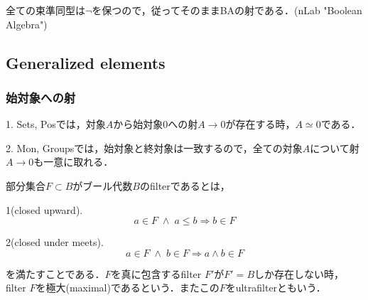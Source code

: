 \documentclass[uplatex, dvipdfmx]{jsarticle}
\begin{document}
\begin{proposition*}
    全ての束準同型は$\lnot$を保つので，従ってそのままBAの射である．(nLab "Boolean Algebra")
\end{proposition*}

\subsection{Generalized elements}\label{subsection-generalized-elements}

\subsubsection*{始対象への射}

\begin{example*}
    1. Sets, Posでは，対象$A$から始対象$0$への射$A\to 0$が存在する時，$A\simeq 0$である．

    2. Mon, Groupsでは，始対象と終対象は一致するので，全ての対象$A$について射$A\to 0$も一意に取れる．
\end{example*}

\begin{definition*}[ultrafilter]
    部分集合$F\subset B$がブール代数$B$のfilterであるとは，

    1(closed upward). \begin{equation}\label{formula-BAfilter-closed-upward}
        a\in F\;\land\; a\le b\Rightarrow b\in F
    \end{equation}

    2(closed under meets). \begin{equation}\label{formula-BAfilter-closed-under-meets}
        a\in F\;\land\; b\in F\Rightarrow a\land b\in F
    \end{equation}
    
    を満たすことである．$F$を真に包含するfilter $F'$が$F'=B$しか存在しない時，filter $F$を極大(maximal)であるという．またこの$F$をultrafilterともいう．
\end{definition*}
\end{document}
